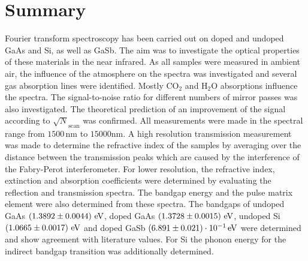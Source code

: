 \section{Summary}
Fourier transform spectroscopy has been carried out on doped and undoped GaAs and Si, as well as GaSb.
The aim was to investigate the optical properties of these materials in the near infrared.
As all samples were measured in ambient air, the influence of the atmosphere on the spectra was 
investigated and several gas absorption lines were identified. Mostly $\text{CO}_2$ and $\text{H}_2\text{O}$ 
absorptions influence the spectra. The signal-to-noise ratio for different numbers of mirror passes was also 
investigated. The theoretical prediction of an improvement of the signal according to $\sqrt{N}_\text{scan}$ was confirmed. 
All measurements were made in the spectral range from $1500\,\text{nm}$ to $15000\text{nm}$.
A high resolution transmission measurement was made to determine the refractive index of the samples 
by averaging over the distance between the transmission peaks which are caused by the interference of the Fabry-Perot interferometer.
For lower resolution, the refractive index, 
extinction and absorption coefficients were determined by evaluating the reflection and transmission spectra.
The bandgap energy and the pulse matrix element were also determined from these spectra. 
The bandgaps of undoped GaAs $\left(1.3892 \pm 0.0044\right)\,\text{eV}$, doped GaAs $\left(1.3728 \pm 0.0015\right)\,\text{eV}$, undoped Si $\left(1.0665 \pm 0.0017\right)\,\text{eV}$ and doped GaSb $\left(6.891 \pm 0.021\right)\cdot 10^{-1}\,\text{eV}$ were determined and show agreement with 
literature values. For Si the phonon energy for the indirect bandgap transition was additionally determined.
